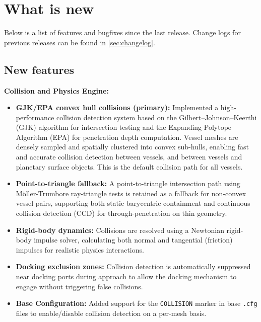 \documentclass[Orbiter User Manual.tex]{subfiles}
\begin{document}
\section{What is new}
Below is a list of features and bugfixes since the last release. Change logs for previous releases can be found in \ref{sec:changelog}.
\subsection{New features}

\begin{itemize}
	\begin{sloppypar}%
	\item \textbf{Collision and Physics Engine:}
	\begin{itemize}
		\item \textbf{GJK/EPA convex hull collisions (primary):} Implemented a high-performance collision detection system based on the Gilbert--Johnson--Keerthi (GJK) algorithm for intersection testing and the Expanding Polytope Algorithm (EPA) for penetration depth computation. Vessel meshes are densely sampled and spatially clustered into convex sub-hulls, enabling fast and accurate collision detection between vessels, and between vessels and planetary surface objects. This is the default collision path for all vessels.
		\item \textbf{Point-to-triangle fallback:} A point-to-triangle intersection path using M\"oller-Trumbore ray-triangle tests is retained as a fallback for non-convex vessel pairs, supporting both static barycentric containment and continuous collision detection (CCD) for through-penetration on thin geometry.
		\item \textbf{Rigid-body dynamics:} Collisions are resolved using a Newtonian rigid-body impulse solver, calculating both normal and tangential (friction) impulses for realistic physics interactions.
		\item \textbf{Docking exclusion zones:} Collision detection is automatically suppressed near docking ports during approach to allow the docking mechanism to engage without triggering false collisions.
		\item \textbf{Base Configuration:} Added support for the \texttt{COLLISION} marker in base \texttt{.cfg} files to enable/disable collision detection on a per-mesh basis.
	\end{itemize}
	\end{sloppypar}
\end{itemize}
\end{document}
